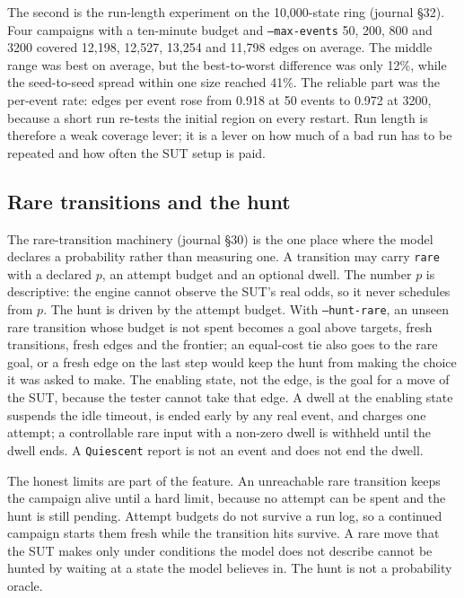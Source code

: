 \documentclass[11pt,a4paper]{article}
\begin{document}
The second is the run-length experiment on the 10{,}000-state ring (journal
\S32).  Four campaigns with a ten-minute budget and \texttt{--max-events} 50,
200, 800 and 3200 covered 12{,}198, 12{,}527, 13{,}254 and 11{,}798 edges on
average.  The middle range was best on average, but the best-to-worst
difference was only 12\%, while the seed-to-seed spread within one size
reached 41\%.  The reliable part was the per-event rate: edges per event rose
from 0.918 at 50 events to 0.972 at 3200, because a short run re-tests the
initial region on every restart.  Run length is therefore a weak coverage
lever; it is a lever on how much of a bad run has to be repeated and how often
the SUT setup is paid.

\subsection{Rare transitions and the hunt}

The rare-transition machinery (journal \S30) is the one place where the model
declares a probability rather than measuring one.  A transition may carry
\texttt{rare} with a declared $p$, an attempt budget and an optional dwell.
The number $p$ is descriptive: the engine cannot observe the SUT's real odds,
so it never schedules from $p$.  The hunt is driven by the attempt budget.
With \texttt{--hunt-rare}, an unseen rare transition whose budget is not spent
becomes a goal above targets, fresh transitions, fresh edges and the frontier;
an equal-cost tie also goes to the rare goal, or a fresh edge on the last step
would keep the hunt from making the choice it was asked to make.  The enabling
state, not the edge, is the goal for a move of the SUT, because the tester
cannot take that edge.  A dwell at the enabling state suspends the idle
timeout, is ended early by any real event, and charges one attempt; a
controllable rare input with a non-zero dwell is withheld until the dwell
ends.  A \texttt{Quiescent} report is not an event and does not end the dwell.

The honest limits are part of the feature.  An unreachable rare transition
keeps the campaign alive until a hard limit, because no attempt can be spent
and the hunt is still pending.  Attempt budgets do not survive a run log, so
a continued campaign starts them fresh while the transition hits survive.
A rare move that the SUT makes only under conditions the model does not
describe cannot be hunted by waiting at a state the model believes in.  The
hunt is not a probability oracle.
\end{document}

